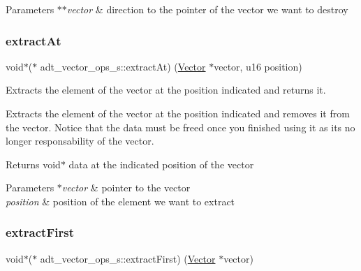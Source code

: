 \begin{DoxyParams}{Parameters}
{\em $\ast$$\ast$vector} & direction to the pointer of the vector we want to destroy \\
\hline
\end{DoxyParams}
\mbox{\label{structadt__vector__ops__s_a3d0a204e8d2a531fa32b82da85fc57cf}} 
\subsubsection{\texorpdfstring{extract\+At}{extractAt}}
{\footnotesize\ttfamily void$\ast$($\ast$ adt\+\_\+vector\+\_\+ops\+\_\+s\+::extract\+At) (\hyperlink{structadt__vector__s}{Vector} $\ast$vector, u16 position)}



Extracts the element of the vector at the position indicated and returns it. 

Extracts the element of the vector at the position indicated and removes it from the vector. Notice that the data must be freed once you finished using it as it\textquotesingle{}s no longer responsability of the vector.

\begin{DoxyReturn}{Returns}
void$\ast$ data at the indicated position of the vector 
\end{DoxyReturn}

\begin{DoxyParams}{Parameters}
{\em $\ast$vector} & pointer to the vector \\
\hline
{\em position} & position of the element we want to extract \\
\hline
\end{DoxyParams}
\mbox{\label{structadt__vector__ops__s_a546695690cc2f88bbf20d3c5966374c9}} 
\subsubsection{\texorpdfstring{extract\+First}{extractFirst}}
{\footnotesize\ttfamily void$\ast$($\ast$ adt\+\_\+vector\+\_\+ops\+\_\+s\+::extract\+First) (\hyperlink{structadt__vector__s}{Vector} $\ast$vector)}



